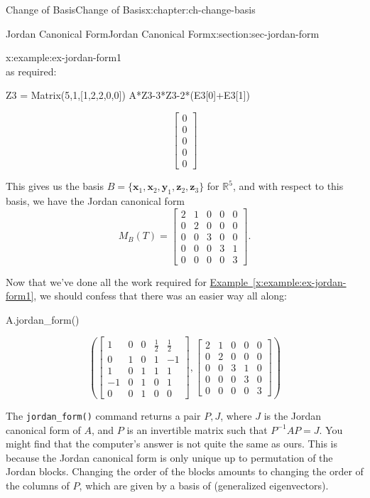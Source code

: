 \documentclass[oneside,10pt,]{book}
\newcommand{\xreffont}{\relax}
\newcommand{\mono}[1]{\texttt{#1}}
\numberwithin{equation}{section}
\newcommand{\bbm}{\begin{bmatrix}}
\newcommand{\ebm}{\end{bmatrix}}
\newcommand{\R}{\mathbb{R}}
\newcommand{\zz}{\mathbf{z}}
\newcommand{\xx}{\mathbf{x}}
\newcommand{\yy}{\mathbf{y}}
\newcommand{\amp}{&}
\begin{document}
\begin{chapterptx}{Change of Basis}{}{Change of Basis}{}{}{x:chapter:ch-change-basis}
\begin{sectionptx}{Jordan Canonical Form}{}{Jordan Canonical Form}{}{}{x:section:sec-jordan-form}
\begin{example}{}{x:example:ex-jordan-form1}
\begin{equation*}
\end{equation*}
as required:%
\begin{sageinput}
Z3 = Matrix(5,1,[1,2,2,0,0])
A*Z3-3*Z3-2*(E3[0]+E3[1])
\end{sageinput}
\begin{sageoutput}
\[\bbm 0\\0\\0\\0\\0\ebm\]
\end{sageoutput}
This gives us the basis \(B = \{\xx_1,\xx_2,\yy_1,\zz_2,\zz_3\}\) for \(\R^5\), and with respect to this basis, we have the Jordan canonical form%
\begin{equation*}
M_B(T) = \bbm 2 \amp 1\amp 0\amp 0 \amp 0\\
0 \amp 2\amp 0\amp 0 \amp 0\\
0 \amp 0\amp 3\amp 0 \amp 0\\
0 \amp 0\amp 0\amp 3 \amp 1\\
0 \amp 0\amp 0\amp 0 \amp 3\ebm\text{.}
\end{equation*}
%
\par
Now that we've done all the work required for \hyperref[x:example:ex-jordan-form1]{Example~{\xreffont\ref{x:example:ex-jordan-form1}}}, we should confess that there was an easier way all along:%
\begin{sageinput}
A.jordan_form()
\end{sageinput}
\begin{sageoutput}
\[\left(\bbm 1\amp 0\amp 0\amp \frac12\amp \frac12\\ 0\amp 1\amp 0\amp 1\amp -1\\
1\amp 0\amp 1\amp 1\amp 1\\-1\amp 0\amp 1\amp 0\amp 1\\0\amp 0\amp 1\amp 0\amp 0\ebm,
\bbm 2\amp 1\amp 0\amp 0\amp 0\\0\amp 2\amp 0\amp 0\amp 0\\
0\amp 0\amp 3\amp 1\amp 0\\0\amp 0\amp 0\amp 3\amp 0\\0\amp 0\amp 0\amp 0\amp 3\ebm\right)\]
\end{sageoutput}
The \mono{jordan\_form()} command returns a pair \(P,J\), where \(J\) is the Jordan canonical form of \(A\), and \(P\) is an invertible matrix such that \(P^{-1}AP=J\). You might find that the computer's answer is not quite the same as ours. This is because the Jordan canonical form is only unique up to permutation of the Jordan blocks. Changing the order of the blocks amounts to changing the order of the columns of \(P\), which are given by a basis of (generalized eigenvectors).%

\end{example}
\end{sectionptx}
\end{chapterptx}
\end{document}
